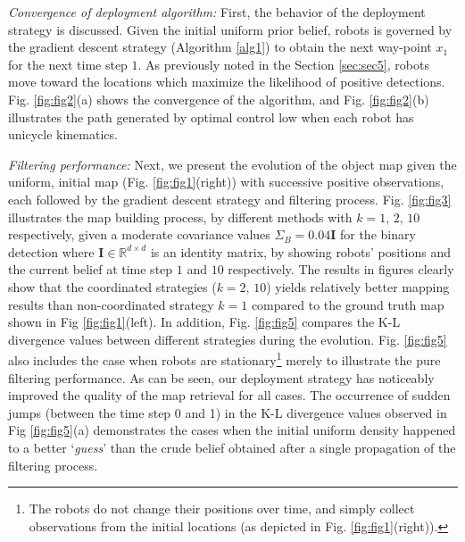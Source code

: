 \documentclass[journal]{IEEEtran}
\begin{document}
\textit{Convergence of deployment algorithm:}
First, the behavior of the deployment strategy is discussed. Given the initial uniform prior belief, robots is governed by the gradient descent strategy (Algorithm \ref{alg1}) to obtain the next way-point $x_1$ for the next time step $1$. As previously noted in the Section \ref{sec:sec5}, robots move toward the locations which maximize the likelihood of positive detections.
Fig. \ref{fig:fig2}(a) shows the convergence of the algorithm, and Fig. \ref{fig:fig2}(b) illustrates the path generated by optimal control low when each robot has unicycle kinematics. 

\textit{Filtering performance:}
Next, we present the evolution of the object map given the uniform, initial map (Fig. \ref{fig:fig1}(right)) with successive positive observations, each followed by the gradient descent strategy and filtering process. Fig. \ref{fig:fig3} illustrates the map building process, by different methods with $k=1,\,2,\,10$ respectively, given a moderate covariance values $\Sigma_B = 0.04\mathbf{I}$ for the binary detection where $\mathbf{I} \in \mathbb{R}^{d\times d}$ is an identity matrix, by showing robots' positions and the current belief at time step $1$ and $10$ respectively.
The results in figures clearly show that the coordinated strategies ($k=2,\,10$) yields relatively better mapping results than non-coordinated strategy $k=1$ compared to the ground truth map shown in Fig \ref{fig:fig1}(left).
In addition, Fig. \ref{fig:fig5} compares the K-L divergence values 
between different strategies during the evolution. Fig. \ref{fig:fig5} also includes the case when robots are stationary\footnote{The robots do not change their positions over time, and simply collect observations from the initial locations (as depicted in Fig. \ref{fig:fig1}(right)).} merely to illustrate the pure filtering performance.  As can be seen, our deployment strategy has noticeably improved the quality of the map retrieval for all cases.
The occurrence of sudden jumps (between the time step 0 and 1) in the K-L divergence values observed in Fig \ref{fig:fig5}(a) demonstrates the cases when the initial uniform density happened to a better `\emph{guess}' than the crude belief obtained after a single propagation of the filtering process.
\end{document}

